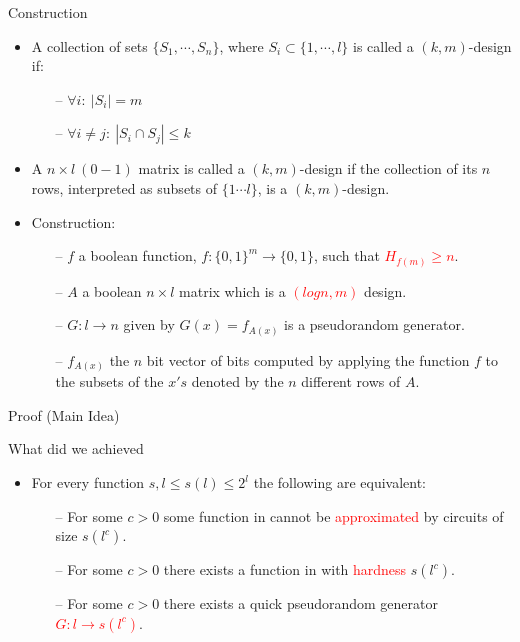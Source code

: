 \documentclass[xcolor={table,dvipsnames,usenames}]{beamer}
\begin{document}
\begin{frame}{Construction}
\begin{itemize}
	\item A collection of sets $\{S_1, \cdots, S_n\}$, where $S_i \subset \{1, \cdots ,l\}$ is called a $(k,m)$-design if:
	\begin{itemize}
		\item[--] $\forall i:~|S_i| = m$
		\item[--] $\forall i \neq j:~|S_i \cap S_j| \leq k$
	\end{itemize}
	\pause
	\item A $n \times l~(0-1)$ matrix is called a $(k,m)$-design if the collection of its $n$ rows, interpreted as subsets of $\{1 \cdots l\}$, is a $(k,m)$-design.
	\pause
	\item Construction:
	\pause
	\begin{itemize}
		\item[--] $f$ a boolean function, $f:\{0, 1\}^m \rightarrow \{0, 1\}$, such that \textcolor{red}{$H_{f(m)} \ge n$}.
		\pause
		\item[--] $A$ a boolean $n \times l$ matrix which is a \textcolor{red}{$(logn,m)$} design.
		\pause
		\item[--] $G:l \rightarrow n$ given by $G(x) = f_{A(x)}$ is a pseudorandom generator.
		\pause
		\item[--] $f_{A(x)}$ the $n$ bit vector of bits computed by applying the function $f$ to the subsets of the $x's$ denoted by the $n$ different rows of $A$.
	\end{itemize}
\end{itemize}
\end{frame}
\begin{frame}{Proof (Main Idea)}
\end{frame}
\begin{frame}{What did we achieved}
\begin{itemize}
	\item  For every function $s, l \leq s(l) \leq 2^l$ the following are equivalent:
	\pause
	\begin{itemize}
		\item[--] For some $c > 0$ some function in {\EXPTIME} cannot be \textcolor{red}{approximated} by circuits of	size $s(l^c)$.
		\pause
		\item[--] For some $c > 0$ there exists a function in {\EXPTIME} with \textcolor{red}{hardness} $s(l^c)$.
		\pause
		\item[--] For some $c > 0$ there exists a quick pseudorandom generator \textcolor{red}{$G:l \rightarrow s(l^c)$}.
	\end{itemize}
\end{itemize}
\end{frame}
\end{document}
